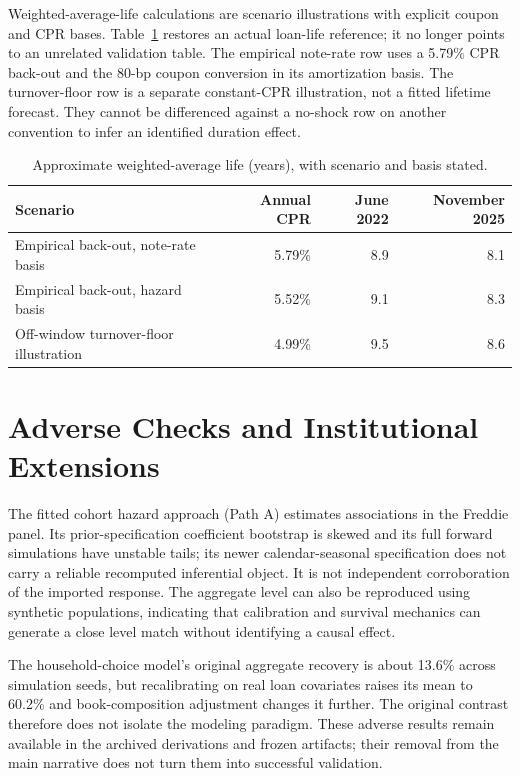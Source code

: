Weighted-average-life calculations are scenario illustrations with explicit coupon and CPR bases. Table~\ref{tab:wal} restores an actual loan-life reference; it no longer points to an unrelated validation table. The empirical note-rate row uses a 5.79\% CPR back-out and the 80-bp coupon conversion in its amortization basis. The turnover-floor row is a separate constant-CPR illustration, not a fitted lifetime forecast. They cannot be differenced against a no-shock row on another convention to infer an identified duration effect.

\begin{table}[H]
\centering\small
\caption{Approximate weighted-average life (years), with scenario and basis stated.}
\label{tab:wal}
\begin{tabular}{@{}lrrr@{}}\toprule
Scenario & Annual CPR & June 2022 & November 2025\\\midrule
Empirical back-out, note-rate basis & 5.79\% & 8.9 & 8.1\\
Empirical back-out, hazard basis & 5.52\% & 9.1 & 8.3\\
Off-window turnover-floor illustration & 4.99\% & 9.5 & 8.6\\\bottomrule
\end{tabular}
\end{table}

\section{Adverse Checks and Institutional Extensions}\label{app:alternatives}

The fitted cohort hazard approach (Path A) estimates associations in the Freddie panel. Its prior-specification coefficient bootstrap is skewed and its full forward simulations have unstable tails; its newer calendar-seasonal specification does not carry a reliable recomputed inferential object. It is not independent corroboration of the imported response. The aggregate level can also be reproduced using synthetic populations, indicating that calibration and survival mechanics can generate a close level match without identifying a causal effect.

The household-choice model's original aggregate recovery is about 13.6\% across simulation seeds, but recalibrating on real loan covariates raises its mean to 60.2\% and book-composition adjustment changes it further. The original contrast therefore does not isolate the modeling paradigm. These adverse results remain available in the archived derivations and frozen artifacts; their removal from the main narrative does not turn them into successful validation.

